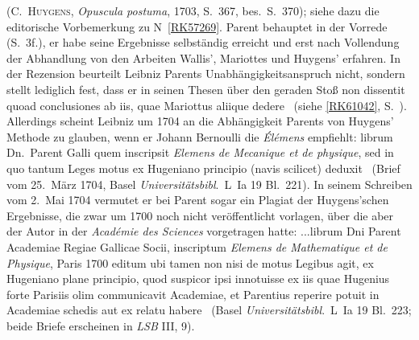 \begin{ledgroup}
%
(\protect{}\textsc{C.~Huygens}, \cite{02076}\textit{Opuscula postuma}, 1703, S.~367, bes.\ S.~370);
%
siehe dazu die editorische Vorbemerkung zu N~\ref{RK57269}.
%
%
\protect{}Parent behauptet in der Vorrede (S.~\lbrack3f.\rbrack),
%
er habe seine Ergebnisse selbständig erreicht und
%
erst nach Vollendung der Abhandlung von den Arbeiten 
%
\protect{}Wallis', 
\protect{}Mariottes und 
\protect{}Huygens'  
%
erfahren.
%
In der Rezension beurteilt Leibniz
%
\protect{}Parents Unabhängigkeitsanspruch 
%
nicht, sondern stellt lediglich fest, dass er in seinen Thesen über den geraden Stoß 
%
\glqq non dissentit quoad conclusiones ab iis, quae \protect{}Mariottus aliique dedere\grqq\ 
%
(siehe \ref{RK61042}, S.~).
%
Allerdings scheint Leibniz um 1704 an die  Abhängigkeit 
%
\protect{}Parents von \protect{}Huygens' Methode zu glauben, 
%
wenn er \protect{}Johann Bernoulli
%
die \cite{01500}\textit{Élémens} empfiehlt:
%
\glqq librum Dn.\ Parent Galli quem inscripsit \textit{Elemens de Mecanique et de physique}, sed in quo tantum Leges motus ex Hugeniano principio (navis scilicet) deduxit\grqq\
%
(Brief vom 25.\ März 1704, Basel \textit{Universitätsbibl}.\ L~Ia 19 Bl.~221\textendash222).
%
In seinem Schreiben vom 2.\ Mai 1704 vermutet er bei Parent sogar ein Plagiat der
%
\protect{}Huygens'schen Ergebnisse, die zwar um 1700 noch nicht veröffentlicht vorlagen, 
%
über die aber der Autor in der \textit{Académie des Sciences} vorgetragen hatte:
%
\glqq...librum Dni Parent Academiae Regiae Gallicae Socii, inscriptum \textit{Elemens de Mathematique et de Physique}, Paris 1700 editum ubi tamen non nisi de motus Legibus agit, ex Hugeniano plane principio, quod suspicor ipsi innotuisse ex iis quae Hugenius forte Parisiis olim communicavit Academiae, et Parentius reperire potuit in Academiae schedis aut ex relatu habere\grqq\ 
%
(Basel \textit{Universitätsbibl}.\ L~Ia 19 Bl.~223; beide Briefe erscheinen in \textit{LSB} III, 9).
% 
% 
%
\pend
%
\end{ledgroup}